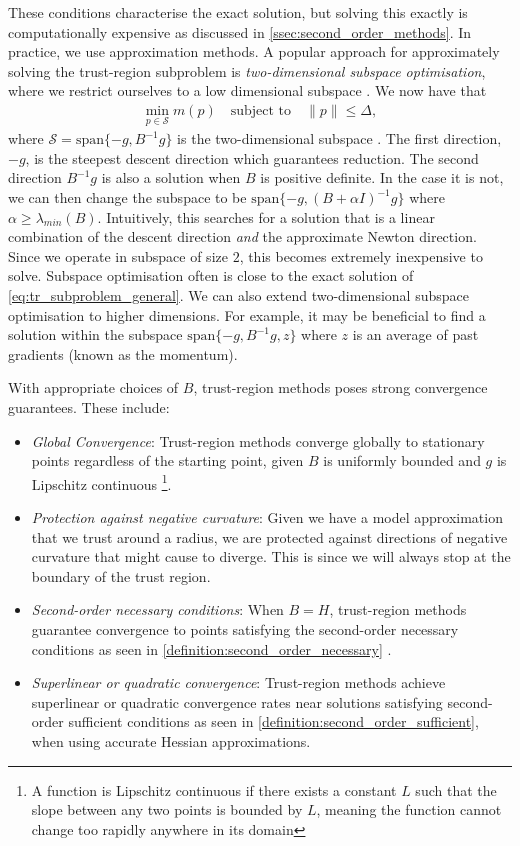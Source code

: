These conditions characterise the exact solution, but solving this exactly is computationally expensive as discussed in \cref{ssec:second_order_methods}. In practice, we use approximation methods. A popular approach for approximately solving the trust-region subproblem is \textit{two-dimensional subspace optimisation}, where we restrict ourselves to a low dimensional subspace \citep{NoceWrig06}. We now have that 
\begin{align}
    \min_{p \in \mathcal{S}} m(p) \quad \text{subject to} \quad \|p\| \leq \Delta,
    \label{eq:subspace_tr_subproblem}
\end{align}
where $\mathcal{S} = \text{span}\{-g, B^{-1}g\}$ is the two-dimensional subspace \citep{NoceWrig06}. The first direction, $-g$, is the steepest descent direction which guarantees reduction. The second direction $B^{-1}g$ is also a solution when $B$ is positive definite. In the case it is not, we can then change the subspace to be $\text{span}\{-g, (B + \alpha I)^{-1}g\}$ where $\alpha \geq \lambda_{min}(B)$. Intuitively, this searches for a solution that is a linear combination of the descent direction \textit{and} the approximate Newton direction. Since we operate in subspace of size $2$, this becomes extremely inexpensive to solve. Subspace optimisation often is close to the exact solution of \cref{eq:tr_subproblem_general}. We can also extend two-dimensional subspace optimisation to higher dimensions. For example, it may be beneficial to find a solution within the subspace $\text{span}\{-g, B^{-1}g, z\}$ where $z$ is an average of past gradients (known as the momentum). 

With appropriate choices of $B$, trust-region methods poses strong convergence guarantees. These include:
\begin{itemize}
    \item \textit{Global Convergence}: Trust-region methods converge globally to stationary points regardless of the starting point, given $B$ is uniformly bounded and $g$ is Lipschitz continuous \citep{NoceWrig06} \footnote{A function is Lipschitz continuous if there exists a constant $L$ such that the slope between any two points is bounded by $L$, meaning the function cannot change too rapidly anywhere in its domain}.
    \item \textit{Protection against negative curvature}: Given we have a model approximation that we trust around a radius, we are protected against directions of negative curvature that might cause to diverge. This is since we will always stop at the boundary of the trust region.
    \item \textit{Second-order necessary conditions}: When $B = H$, trust-region methods guarantee convergence to points satisfying the second-order necessary conditions as seen in \cref{definition:second_order_necessary} \citep{NoceWrig06}.
    \item \textit{Superlinear or quadratic convergence}: Trust-region methods achieve superlinear or quadratic convergence rates near solutions satisfying second-order sufficient conditions as seen in \cref{definition:second_order_sufficient}, when using accurate Hessian approximations.
\end{itemize}

